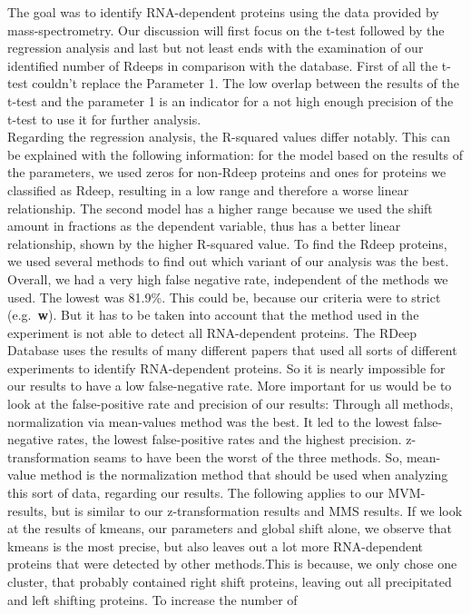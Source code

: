 \documentclass[
  12pt,
]{article}
\begin{document}
The goal was to identify RNA-dependent proteins using the data provided
by mass-spectrometry. Our discussion will first focus on the t-test
followed by the regression analysis and last but not least ends with the
examination of our identified number of Rdeeps in comparison with the
database. First of all the t-test couldn't replace the Parameter 1. The
low overlap between the results of the t-test and the parameter 1 is an
indicator for a not high enough precision of the t-test to use it for
further analysis.\\
Regarding the regression analysis, the R-squared values differ notably.
This can be explained with the following information: for the model
based on the results of the parameters, we used zeros for non-Rdeep
proteins and ones for proteins we classified as Rdeep, resulting in a
low range and therefore a worse linear relationship. The second model
has a higher range because we used the shift amount in fractions as the
dependent variable, thus has a better linear relationship, shown by the
higher R-squared value. To find the Rdeep proteins, we used several
methods to find out which variant of our analysis was the best. Overall,
we had a very high false negative rate, independent of the methods we
used. The lowest was 81.9\%. This could be, because our criteria were to
strict (e.g.~\textbf{w}). But it has to be taken into account that the
method used in the experiment is not able to detect all RNA-dependent
proteins. The RDeep Database uses the results of many different papers
that used all sorts of different experiments to identify RNA-dependent
proteins. So it is nearly impossible for our results to have a low
false-negative rate. More important for us would be to look at the
false-positive rate and precision of our results: Through all methods,
normalization via mean-values method was the best. It led to the lowest
false-negative rates, the lowest false-positive rates and the highest
precision. z-transformation seams to have been the worst of the three
methods. So, mean-value method is the normalization method that should
be used when analyzing this sort of data, regarding our results. The
following applies to our MVM-results, but is similar to our
z-transformation results and MMS results. If we look at the results of
kmeans, our parameters and global shift alone, we observe that kmeans is
the most precise, but also leaves out a lot more RNA-dependent proteins
that were detected by other methods.This is because, we only chose one
cluster, that probably contained right shift proteins, leaving out all
precipitated and left shifting proteins. To increase the number of
\end{document}
